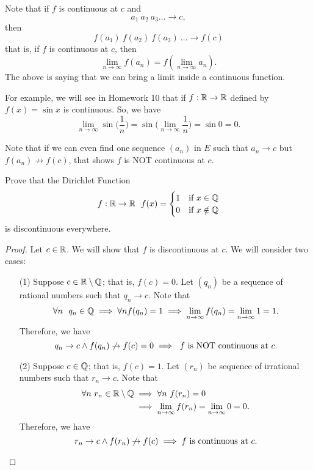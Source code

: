 \documentclass[a4paper]{article}
\begin{document}
Note that if \( f  \) is continuous at \( c  \) and 
\[ {a}_{1} \ {a}_{2} \ {a}_{3} \dots \to c, \]
then
\[  f({a}_{1}) \ f({a}_{2}) \ f({a}_{3}) \ \dots \to f(c) \]
that is, if \( f  \) is continuous at \( c  \), then
\[  \lim_{ n \to \infty  }  f({a}_{n}) = f(\lim_{ n \to \infty  }  {a}_{n}). \]
The above is saying that we can bring a limit inside a continuous function.

For example, we will see in Homework 10 that if \( f: \mathbb{R} \to \mathbb{R}  \) defined by \( f(x) = \sin x  \) is continuous. So, we have 
\[  \lim_{ n \to \infty  } \sin \Big(  \frac{ 1 }{ n }  \Big) = \sin \Big(\lim_{ n \to \infty  }  \frac{ 1 }{ n } \Big) = \sin 0 = 0.  \]

Note that if we can even find one sequence \( ({a}_{n}) \) in \( E  \) such that \( {a}_{n} \to c  \) but \( f({a}_{n}) \not\to f(c) \), that shows \( f  \) is NOT continuous at \( c  \).

\begin{eg}
   Prove that the Dirichlet Function 
   \[  f: \mathbb{R} \to \mathbb{R}  \ \ f(x) = 
   \begin{cases}
       1 &\text{if} \  x \in \mathbb{Q} \\
       0 &\text{if} \  x \notin \mathbb{Q} 
   \end{cases} \]
   is discontinuous everywhere.
\end{eg}
\begin{proof}
Let \( c \in \mathbb{R}  \). We will show that \( f  \) is discontinuous at \( c  \). We will consider two cases:
\begin{enumerate}
    \item[(1)] Suppose \( c \in  \mathbb{R} \setminus \mathbb{Q}  \); that is, \( f(c) = 0  \). Let \( ({q}_{n})  \) be a sequence of rational numbers such that \( {q}_{n} \to c  \). Note that  
        \[  \forall n \ \  {q}_{n} \in \Q \implies \forall n f({q}_{n}) = 1  \implies \lim_{ n \to \infty  }  f({q}_{n}) = \lim_{ n \to \infty  } 1 = 1. \]
        Therefore, we have
        \[  {q}_{n} \to c \wedge  f({q}_{n}) \not\to f(c) = 0 \implies \ \text{\( f \) is NOT continuous at \( c \)}.  \]
    \item[(2)] Suppose \( c \in \mathbb{Q}  \); that is, \( f(c) = 1  \). Let \( ({r}_{n}) \) be sequence of irrational numbers such that \( {r}_{n} \to c  \). Note that 
        \begin{align*}
            \forall n \ {r}_{n} \in \R \setminus \Q  &\implies \forall n \ f({r}_{n}) = 0 \\
                                                 &\implies \lim_{ n \to \infty  }  f({r}_{n}) = \lim_{ n \to \infty  }  0 = 0.
        \end{align*}
        Therefore, we have
        \[  {r}_{n} \to c \wedge f({r}_{n}) \not\to f(c) \implies \text{\( f  \) is continuous at \( c \)}. \]
\end{enumerate}
\end{proof}
\end{document}
